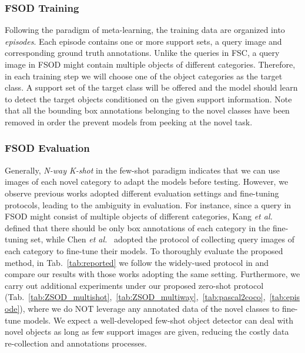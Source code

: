 \documentclass[journal]{IEEEtran}
\newcommand{\etal}{\textit{et al.}}
\begin{document}
\subsubsection{FSOD Training}
Following the paradigm of meta-learning, the training data are organized into \textit{episodes}.
Each episode contains one or more support sets, a query image and corresponding ground truth annotations.
Unlike the queries in FSC, a query image in FSOD might contain multiple objects of different categories.
Therefore, in each training step we will choose one of the object categories as the target class.
A support set of the target class will be offered and the model should learn to detect the target objects conditioned on the given support information.
Note that all the bounding box annotations belonging to the novel classes have been removed in order the prevent models from peeking at the novel task.


\subsubsection{FSOD Evaluation}
\label{section:FSOD_Evaluation}
Generally, \textit{N-way K-shot} in the few-shot paradigm indicates that we can use  images of each novel category to adapt the models before testing. 
However, we observe previous works adopted different evaluation settings and fine-tuning protocols, leading to the ambiguity in evaluation.
For instance, since a query in FSOD might consist of multiple objects of different categories, Kang \etal~\cite{kang2019few} defined that there should be only  box annotations of each category in the fine-tuning set, while Chen \etal~\cite{chen2018lstd} adopted the protocol of collecting  query images of each category to fine-tune their models.
To thoroughly evaluate the proposed method, in Tab.~\ref{tab:reported} we follow the widely-used protocol in \cite{kang2019few} and compare our results with those works adopting the same setting.
Furthermore, we carry out additional experiments under our proposed zero-shot protocol (Tab.~\ref{tab:ZSOD_multishot},~\ref{tab:ZSOD_multiway},~\ref{tab:pascal2coco},~\ref{tab:episode}), where we do NOT leverage any annotated data of the novel classes to fine-tune models.
We expect a well-developed few-shot object detector can deal with novel objects as long as few support images are given, reducing the costly data re-collection and annotations processes. 
\end{document}
